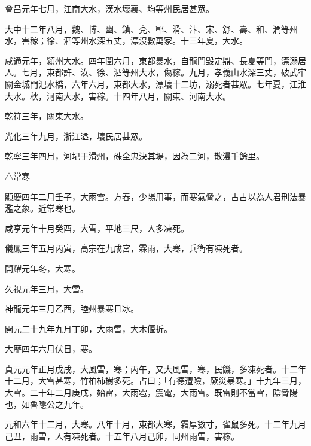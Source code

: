 \begin{pinyinscope}
 會昌元年七月，江南大水，漢水壞襄、均等州民居甚眾。



 大中十二年八月，魏、博、幽、鎮、兗、鄆、滑、汴、宋、舒、壽、和、潤等州水，害稼；徐、泗等州水深五丈，漂沒數萬家。十三年夏，大水。



 咸通元年，潁州大水。四年閏六月，東都暴水，自龍門毀定鼎、長夏等門，漂溺居人。七月，東都許、汝、徐、泗等州大水，傷稼。九月，孝義山水深三丈，破武牢關金城門汜水橋，六年六月，東都大水，漂壞十二坊，溺死者甚眾。七年夏，江淮大水。秋，河南大水，害稼。十四年八月，關東、河南大水。



 乾符三年，關東大水。



 光化三年九月，浙江溢，壞民居甚眾。



 乾寧三年四月，河圮于滑州，硃全忠決其堤，因為二河，散漫千餘里。



 △常寒



 顯慶四年二月壬子，大雨雪。方春，少陽用事，而寒氣脅之，古占以為人君刑法暴濫之象。近常寒也。



 咸亨元年十月癸酉，大雪，平地三尺，人多凍死。



 儀鳳三年五月丙寅，高宗在九成宮，霖雨，大寒，兵衛有凍死者。



 開耀元年冬，大寒。



 久視元年三月，大雪。



 神龍元年三月乙酉，睦州暴寒且冰。



 開元二十九年九月丁卯，大雨雪，大木偃折。



 大歷四年六月伏日，寒。



 貞元元年正月戊戌，大風雪，寒；丙午，又大風雪，寒，民饑，多凍死者。十二年十二月，大雪甚寒，竹柏柿樹多死。占曰；「有德遭險，厥災暴寒。」十九年三月，大雪。二十年二月庚戌，始雷，大雨雹，震電，大雨雪。既雷則不當雪，陰脅陽也，如魯隱公之九年。



 元和六年十二月，大寒。八年十月，東都大寒，霜厚數寸，雀鼠多死。十二年九月己丑，雨雪，人有凍死者。十五年八月己卯，同州雨雪，害稼。




\end{pinyinscope}
